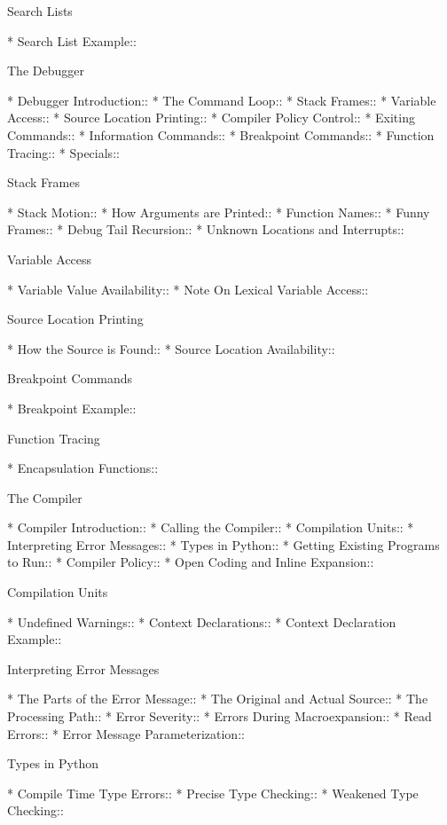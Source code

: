 \begin{menu}
Search Lists

* Search List Example::         

The Debugger

* Debugger Introduction::       
* The Command Loop::            
* Stack Frames::                
* Variable Access::             
* Source Location Printing::    
* Compiler Policy Control::     
* Exiting Commands::            
* Information Commands::        
* Breakpoint Commands::
* Function Tracing::            
* Specials::                    

Stack Frames

* Stack Motion::                
* How Arguments are Printed::   
* Function Names::              
* Funny Frames::                
* Debug Tail Recursion::        
* Unknown Locations and Interrupts::  

Variable Access

* Variable Value Availability::  
* Note On Lexical Variable Access::  

Source Location Printing

* How the Source is Found::     
* Source Location Availability::  

Breakpoint Commands

* Breakpoint Example::

Function Tracing

* Encapsulation Functions::     

The Compiler

* Compiler Introduction::       
* Calling the Compiler::        
* Compilation Units::           
* Interpreting Error Messages::  
* Types in Python::             
* Getting Existing Programs to Run::  
* Compiler Policy::             
* Open Coding and Inline Expansion::  

Compilation Units

* Undefined Warnings::          
* Context Declarations::        
* Context Declaration Example::  

Interpreting Error Messages

* The Parts of the Error Message::  
* The Original and Actual Source::  
* The Processing Path::         
* Error Severity::              
* Errors During Macroexpansion::  
* Read Errors::                 
* Error Message Parameterization::  

Types in Python

* Compile Time Type Errors::    
* Precise Type Checking::       
* Weakened Type Checking::      


\end{menu}
